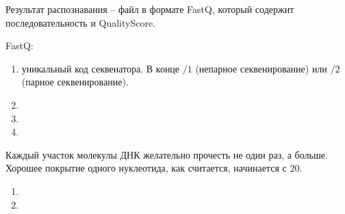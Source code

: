 \documentclass[main.tex]{subfiles}
\begin{document}
Результат распознавания -- файл в формате FastQ, который содержит последовательность и QualityScore.

FastQ:
\begin{enumerate}[noitemsep]
    \item уникальный код секвенатора. В конце $ /1 $ (непарное секвенирование) или $ /2 $ (парное секвенирование).
    \item
    \item
    \item
\end{enumerate}

Каждый участок молекулы ДНК желательно прочесть не один раз, а больше.
Хорошее покрытие одного нуклеотида, как считается, начинается с 20.


\begin{enumerate}[noitemsep]
    \item
    \item
\end{enumerate}
\end{document}
